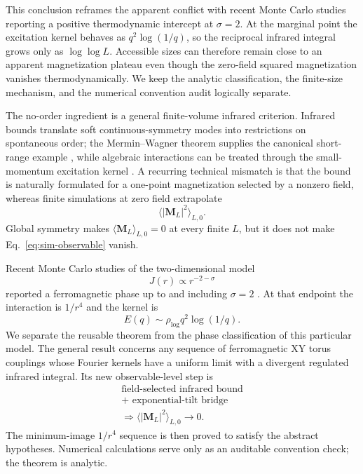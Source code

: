 \documentclass[aps,prb,twocolumn,groupedaddress,amsmath,amssymb,
               superscriptaddress,nofootinbib,floatfix]{revtex4-2}
\theoremstyle{plain}
\theoremstyle{definition}
\begin{document}
This conclusion reframes the apparent conflict with recent Monte Carlo
studies reporting a positive thermodynamic intercept at $\sigma=2$.  At the
marginal point the excitation kernel behaves as $q^2\log(1/q)$, so the
reciprocal infrared integral grows only as $\log\log L$.  Accessible sizes
can therefore remain close to an apparent magnetization plateau even though
the zero-field squared magnetization vanishes thermodynamically.  We keep the
analytic classification, the finite-size mechanism, and the numerical
convention audit logically separate.

The no-order ingredient is a general finite-volume infrared criterion.
Infrared bounds translate soft continuous-symmetry modes into restrictions
on spontaneous order; the Mermin--Wagner theorem supplies the canonical
short-range example \cite{MerminWagner1966}, while algebraic interactions can
be treated through the small-momentum excitation kernel
\cite{Bruno2001,Messager1984,Ioffe2002}.  A recurring technical mismatch is
that the bound is naturally formulated for a one-point magnetization selected
by a nonzero field, whereas finite simulations at zero field extrapolate
\begin{equation}
 \langle|\bm M_L|^2\rangle_{L,0}.
\label{eq:sim-observable}
\end{equation}
Global symmetry makes $\langle\bm M_L\rangle_{L,0}=0$ at every finite
$L$, but it does not make Eq.~\eqref{eq:sim-observable} vanish.

Recent Monte Carlo studies of the two-dimensional model
\begin{equation}
 J(r)\propto r^{-2-\sigma}
\end{equation}
reported a ferromagnetic phase up to and including $\sigma=2$
\cite{Xiao2025,Yao2025}.  At that endpoint the interaction is $1/r^4$ and
the kernel is
\begin{equation}
 E(q)\sim \rho_{\log}q^2\log(1/q).
\label{eq:marginal-intro}
\end{equation}
We separate the reusable theorem from the phase classification of this
particular model.  The
general result concerns any sequence of ferromagnetic XY torus couplings
whose Fourier kernels have a uniform limit with a divergent regulated
infrared integral.  Its new observable-level step is
\begin{equation}
\begin{gathered}
 \text{field-selected infrared bound}\\
 {}+\text{ exponential-tilt bridge}\\[-0.2em]
 \Longrightarrow
 \langle|\bm M_L|^2\rangle_{L,0}\longrightarrow0.
\end{gathered}
\label{eq:logical-chain}
\end{equation}
The minimum-image $1/r^4$ sequence is then proved to satisfy the abstract
hypotheses.  Numerical calculations serve only as an auditable convention
check; the theorem is analytic.
\end{document}

